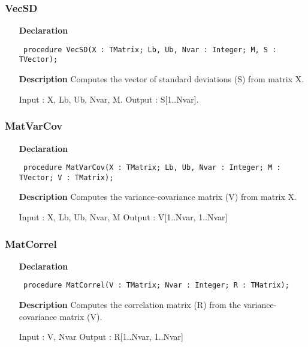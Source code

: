 \documentclass[12pt,a4paper,oneside]{report}
\newcommand{\declarationitem}[1]{\textbf{#1}}
\newcommand{\descriptiontitle}[1]{\textbf{#1}}
\newcommand{\code}[1]{\texttt{#1}}
\begin{document}
\subsubsection{VecSD}
\label{upca-VecSD}
\begin{itemize}\item[\declarationitem{Declaration}\hfill]
	\begin{flushleft}
		\code{
			procedure VecSD(X : TMatrix; Lb, Ub, Nvar : Integer; M, S : TVector);}
	\end{flushleft}
	\item[\descriptiontitle{Description}]
	Computes the vector of standard deviations (S) from matrix X.
	
	Input : X, Lb, Ub, Nvar, M. Output : S[1..Nvar].
	
\end{itemize}
\subsubsection{MatVarCov}
\label{upca-MatVarCov}
\begin{itemize}\item[\declarationitem{Declaration}\hfill]
	\begin{flushleft}
		\code{
			procedure MatVarCov(X : TMatrix; Lb, Ub, Nvar : Integer; M : TVector; V : TMatrix);}
	\end{flushleft}
	\item[\descriptiontitle{Description}]
	Computes the variance{-}covariance matrix (V) from matrix X.
	
	Input : X, Lb, Ub, Nvar, M Output : V[1..Nvar, 1..Nvar]
\end{itemize}
\subsubsection{MatCorrel}
\label{upca-MatCorrel}
\begin{itemize}\item[\declarationitem{Declaration}\hfill]
	\begin{flushleft}
		\code{
			procedure MatCorrel(V : TMatrix; Nvar : Integer; R : TMatrix);}
	\end{flushleft}
	\item[\descriptiontitle{Description}]
	Computes the correlation matrix (R) from the variance{-}covariance matrix (V).
	
	Input : V, Nvar Output : R[1..Nvar, 1..Nvar]
\end{itemize}
\end{document}
